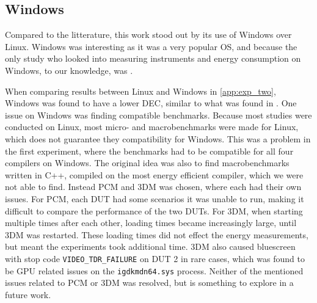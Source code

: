 \subsection{Windows}

Compared to the litterature, this work stood out by its use of Windows over Linux\cite{khan2018rapl, georgiou2020energy, pereira2017}. Windows was interesting as it was a very popular OS, and because the only study who looked into measuring instruments and energy consumption on Windows, to our knowledge, was \cite{biksbois}.

When comparing results between Linux and Windows in \cref{app:exp_two}, Windows was found to have a lower DEC, similar to what was found in \cite{biksbois}. One issue on Windows was finding compatible benchmarks. Because most studies were conducted on Linux, most micro- and macrobenchmarks were made for Linux, which does not guarantee they compatibility for Windows. This was a problem in the first experiment, where the benchmarks had to be compatible for all four compilers on Windows. The original idea was also to find macrobenchmarks written in C++, compiled on the most energy efficient compiler, which we were not able to find. Instead PCM and 3DM was chosen, where each had their own issues. For PCM, each DUT had some scenarios it was unable to run, making it difficult to compare the performance of the two DUTs. For 3DM, when starting multiple times after each other, loading times became increasingly large, until 3DM was restarted. These loading times did not effect the energy measurements, but meant the experiments took additional time. 3DM also caused bluescreen with stop code \texttt{VIDEO\_TDR\_FAILURE} on DUT 2 in rare cases, which was found to be GPU related issues on the \texttt{igdkmdn64.sys} process. Neither of the mentioned issues related to PCM or 3DM was resolved, but is something to explore in a future work.



